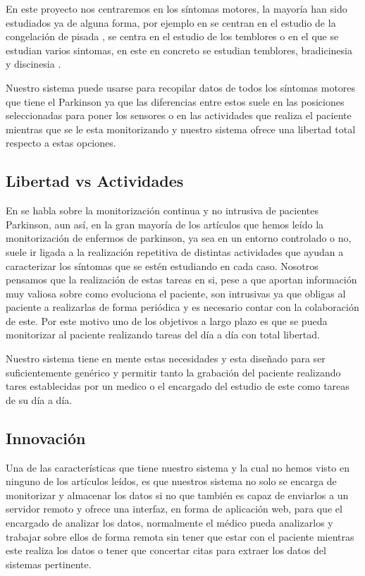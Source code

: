 En este proyecto nos centraremos en los síntomas motores, la mayoría han sido estudiados ya de alguna forma, por ejemplo en \cite{resumen3} se centran en el estudio de la congelación de pisada \cite{gait}, \cite{resumen5} se centra en el estudio de los temblores o \cite{resumen4} en el que se estudian varios sintomas, en este en concreto se estudian temblores, bradicinesia \cite{hipocinesia} y discinesia \cite{dyskinesia}.
\newline

Nuestro sistema puede usarse para recopilar datos de todos los síntomas motores que tiene el Parkinson ya que las diferencias entre estos suele en las posiciones seleccionadas para poner los sensores o en las actividades que realiza el paciente mientras que se le esta monitorizando y nuestro sistema ofrece una libertad total respecto a estas opciones.

\subsection{Libertad vs Actividades}

En \cite{resumen2} se habla sobre la monitorización continua y no intrusiva de pacientes Parkinson, aun así, en la gran mayoría de los artículos que hemos leído la monitorización de enfermos de parkinson, ya sea en un entorno controlado o no, suele ir ligada a la realización repetitiva de distintas actividades que ayudan a caracterizar los síntomas que se estén estudiando en cada caso. Nosotros pensamos que la realización de estas tareas en si, pese a que aportan información muy valiosa sobre como evoluciona el paciente, son intrusivas ya que obligas al paciente a realizarlas de forma periódica y es necesario contar con la colaboración de este. Por este motivo uno de los objetivos a largo plazo es que se pueda monitorizar al paciente realizando tareas del día a día con total libertad.
\newline

Nuestro sistema tiene en mente estas necesidades y esta diseñado para ser suficientemente genérico y permitir tanto la grabación del paciente realizando tares establecidas por un medico o el encargado del estudio de este como tareas de su día a día.

\subsection{Innovación}

Una de las características que tiene nuestro sistema y la cual no hemos visto en ninguno de los artículos leídos, es que nuestros sistema no solo se encarga de monitorizar y almacenar los datos si no que también es capaz de enviarlos a un servidor remoto y ofrece una interfaz, en forma de aplicación web, para que el encargado de analizar los datos, normalmente el médico pueda analizarlos y trabajar sobre ellos de forma remota sin tener que estar con el paciente mientras este realiza los datos o tener que concertar citas para extraer los datos del sistemas pertinente.
\newline

